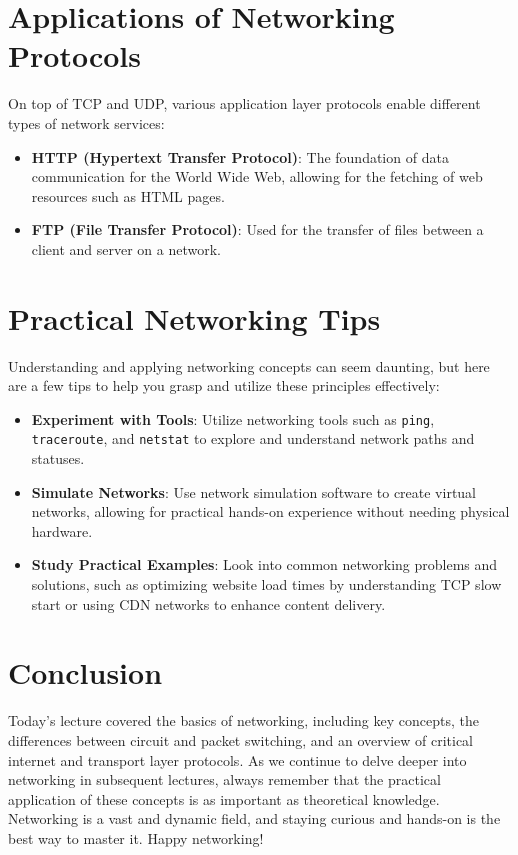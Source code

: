 \documentclass{article}
\begin{document}
\section{Applications of Networking Protocols}

On top of TCP and UDP, various application layer protocols enable different types of network services:

\begin{itemize}
  \item \textbf{HTTP (Hypertext Transfer Protocol)}: The foundation of data communication for the World Wide Web, allowing for the fetching of web resources such as HTML pages.
  \item \textbf{FTP (File Transfer Protocol)}: Used for the transfer of files between a client and server on a network.
\end{itemize}

\section{Practical Networking Tips}

Understanding and applying networking concepts can seem daunting, but here are a few tips to help you grasp and utilize these principles effectively:

\begin{itemize}
  \item \textbf{Experiment with Tools}: Utilize networking tools such as \texttt{ping}, \texttt{traceroute}, and \texttt{netstat} to explore and understand network paths and statuses.
  \item \textbf{Simulate Networks}: Use network simulation software to create virtual networks, allowing for practical hands-on experience without needing physical hardware.
  \item \textbf{Study Practical Examples}: Look into common networking problems and solutions, such as optimizing website load times by understanding TCP slow start or using CDN networks to enhance content delivery.
\end{itemize}

\section{Conclusion}

Today's lecture covered the basics of networking, including key concepts, the differences between circuit and packet switching, and an overview of critical internet and transport layer protocols. As we continue to delve deeper into networking in subsequent lectures, always remember that the practical application of these concepts is as important as theoretical knowledge. Networking is a vast and dynamic field, and staying curious and hands-on is the best way to master it. Happy networking!
\end{document}
